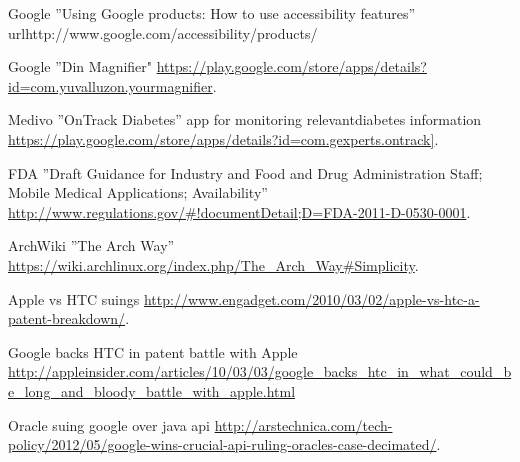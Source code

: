 \documentclass[conference]{IEEEtran}
\begin{document}
\begin{thebibliography}{1}
Google ''Using Google products: How to use accessibility features'' url{http://www.google.com/accessibility/products/}

Google ''Din Magnifier" \url{https://play.google.com/store/apps/details?id=com.yuvalluzon.yourmagnifier}.

Medivo ''OnTrack Diabetes'' app for monitoring relevantdiabetes information
\url{https://play.google.com/store/apps/details?id=com.gexperts.ontrack]}.

FDA ''Draft Guidance for Industry and Food and Drug Administration Staff; Mobile Medical Applications; Availability''
\url{http://www.regulations.gov/#!documentDetail;D=FDA-2011-D-0530-0001}.

ArchWiki ''The Arch Way'' \url{https://wiki.archlinux.org/index.php/The\_Arch\_Way#Simplicity}.

Apple vs HTC suings
\url{http://www.engadget.com/2010/03/02/apple-vs-htc-a-patent-breakdown/}.

Google backs HTC in patent battle with Apple
\url{http://appleinsider.com/articles/10/03/03/google_backs_htc_in_what_could_be_long_and_bloody_battle_with_apple.html}

Oracle suing google over java api
\url{http://arstechnica.com/tech-policy/2012/05/google-wins-crucial-api-ruling-oracles-case-decimated/}.






\end{thebibliography}
\end{document}
